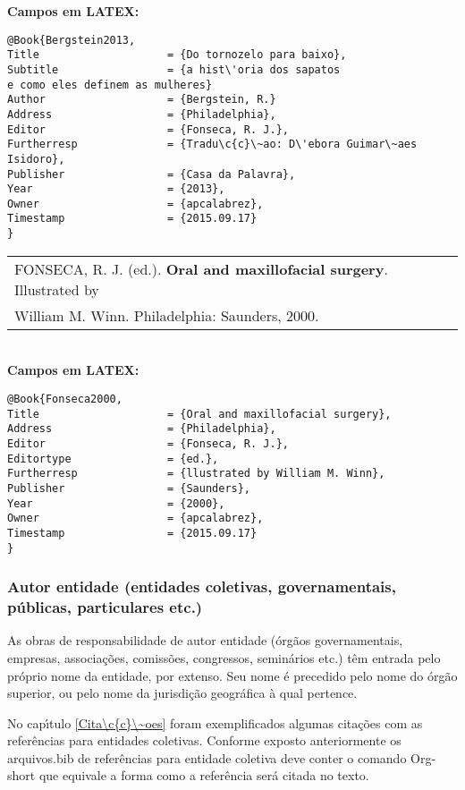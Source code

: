 \textbf{Campos em LATEX:}

\begin{verbatim}
@Book{Bergstein2013,
Title                    = {Do tornozelo para baixo},
Subtitle                 = {a hist\'oria dos sapatos 
e como eles definem as mulheres}
Author                   = {Bergstein, R.}
Address                  = {Philadelphia},
Editor                   = {Fonseca, R. J.},
Furtherresp              = {Tradu\c{c}\~ao: D\'ebora Guimar\~aes
Isidoro},
Publisher                = {Casa da Palavra},
Year                     = {2013},
Owner                    = {apcalabrez},
Timestamp                = {2015.09.17}
}
\end{verbatim}

\begin{tabular}{|l|c|} \hline
	FONSECA, R. J. (ed.). \textbf{Oral and maxillofacial surgery}. Illustrated by\\
	William M. Winn. Philadelphia: Saunders, 2000. \\\hline
\end{tabular}\\

\textbf{Campos em LATEX:}

\begin{verbatim}
@Book{Fonseca2000,
Title                    = {Oral and maxillofacial surgery},
Address                  = {Philadelphia},
Editor                   = {Fonseca, R. J.},
Editortype               = {ed.},
Furtherresp              = {llustrated by William M. Winn},
Publisher                = {Saunders},
Year                     = {2000},
Owner                    = {apcalabrez},
Timestamp                = {2015.09.17}
}
\end{verbatim}


\subsubsection{Autor entidade (entidades coletivas, governamentais, p\'ublicas, particulares etc.)} 

As obras de responsabilidade de autor entidade (\'org\~aos governamentais, empresas, associa\c{c}\~oes, comiss\~oes, congressos, semin\'arios etc.) t\^em entrada pelo pr\'oprio nome da entidade, por extenso. Seu nome \'e precedido pelo nome do \'org\~ao superior, ou pelo nome da jurisdi\c{c}\~ao geogr\'afica \`a qual pertence. 

No cap\'{\i}tulo \ref{Cita\c{c}\~oes} foram exemplificados algumas cita\c{c}\~oes com  as refer\^encias para entidades coletivas. Conforme exposto anteriormente os arquivos.bib de refer\^encias para entidade coletiva deve conter o comando Org-short que equivale a forma como a refer\^encia ser\'a citada no texto. \\


